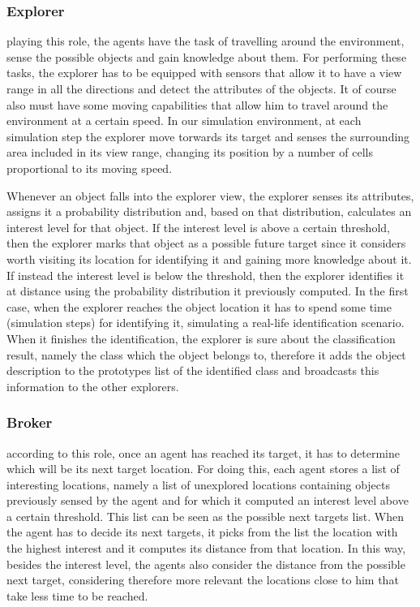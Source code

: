 \documentclass[a4paper, 10pt, conference]{ieeeconf}      %
\begin{document}
\subsubsection{Explorer}
playing this role, the agents have the task of travelling around the environment, sense the possible objects and gain knowledge about them. For performing these tasks, the explorer has to be equipped with sensors that allow it to have a view range in all the directions and detect the attributes of the objects. It of course also must have some moving capabilities that allow him to travel around the environment at a certain speed. In our simulation environment, at each simulation step the explorer move torwards its target and senses the surrounding area included in its view range, changing its position by a number of cells proportional to its moving speed.

Whenever an object falls into the explorer view, the explorer senses its attributes, assigns it a probability distribution and, based on that distribution, calculates an interest level for that object. If the interest level is above a certain threshold, then the explorer marks that object as a possible future target since it considers worth visiting its location for identifying it and gaining more knowledge about it. If instead the interest level is below the threshold, then the explorer identifies it at distance using the probability distribution it previously computed. In the first case, when the explorer reaches the object location it has to spend some time (simulation steps) for identifying it, simulating a real-life identification scenario. When it finishes the identification, the explorer is sure about the classification result, namely the class which the object belongs to, therefore it adds the object description to the prototypes list of the identified class and broadcasts this information to the other explorers. 

\subsubsection{Broker}
according to this role, once an agent has reached its target, it has to determine which will be its next target location. For doing this, each agent stores a list of interesting locations, namely a list of unexplored locations containing objects previously sensed by the agent and for which it computed an interest level above a certain threshold. This list can be seen as the possible next targets list. When the agent has to decide its next targets, it picks from the list the location with the highest interest and it computes its distance from that location. In this way, besides the interest level, the agents also consider the distance from the possible next target, considering therefore more relevant the locations close to him that take less time to be reached. 
\end{document}
